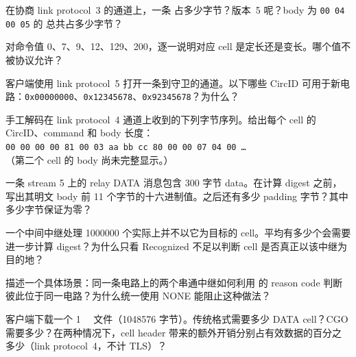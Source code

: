 \begin{esercizio}[1]\label{es:08-lunghezze}
在协商 link protocol~3 的通道上，一条  占多少字节？版本~5 呢？body 为 \texttt{00 04 00 05} 的  总共占多少字节？
\end{esercizio}

\begin{esercizio}[1]\label{es:08-formato}
对命令值 0、7、9、12、129、200，逐一说明对应 cell 是定长还是变长。哪个值不被协议允许？
\end{esercizio}

\begin{esercizio}[1]\label{es:08-circid}
客户端使用 link protocol~5 打开一条到守卫的通道。以下哪些 CircID 可用于新电路：\texttt{0x00000000}、\texttt{0x12345678}、\texttt{0x92345678}？为什么？
\end{esercizio}

\begin{esercizio}[2]\label{es:08-hex}
手工解码在 link protocol~4 通道上收到的下列字节序列。给出每个 cell 的 CircID、command 和 body 长度：\\
\texttt{00 00 00 00 81 00 03 aa bb cc 80 00 00 07 04 00 \ldots}\\
（第二个 cell 的 body 尚未完整显示。）
\end{esercizio}

\begin{esercizio}[2]\label{es:08-relay}
一条 stream 5 上的 relay DATA 消息包含 300 字节 data。在计算 digest 之前，写出其明文 body 前 11 个字节的十六进制值。之后还有多少 padding 字节？其中多少字节保证为零？
\end{esercizio}

\begin{esercizio}[2]\label{es:08-recognized}
一个中间中继处理 \num{1000000} 个实际上并不以它为目标的 cell。平均有多少个会需要进一步计算 digest？为什么只看 Recognized 不足以判断 cell 是否真正以该中继为目的地？
\end{esercizio}

\begin{esercizio}[2]\label{es:08-destroy}
描述一个具体场景：同一条电路上的两个串通中继如何利用  的 reason code 判断彼此位于同一电路？为什么统一使用 NONE 能阻止这种做法？
\end{esercizio}

\begin{esercizio}[2]\label{es:08-efficienza}
客户端下载一个 \SI{1}{\mebi\byte} 文件（\num{1048576} 字节）。传统格式需要多少 DATA cell？CGO 需要多少？在两种情况下，cell header 带来的额外开销分别占有效数据的百分之多少（link protocol~4，不计 TLS）？
\end{esercizio}

